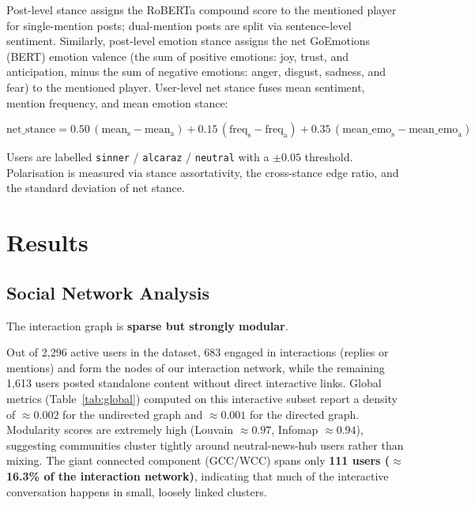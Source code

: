 \documentclass[12pt,a4paper]{article}
\begin{document}
Post-level stance assigns the RoBERTa compound score to the mentioned player for single-mention
posts; dual-mention posts are split via sentence-level sentiment. Similarly, post-level emotion stance assigns the net GoEmotions (BERT) emotion valence (the sum of positive emotions: joy, trust, and anticipation, minus the sum of negative emotions: anger, disgust, sadness, and fear) to the mentioned player.
User-level net stance fuses mean sentiment, mention frequency, and mean emotion stance:

\[
\text{net\_stance} = 0.50\,(\text{mean}_\text{s} - \text{mean}_\text{a})
                   + 0.15\,(\text{freq}_\text{s} - \text{freq}_\text{a})
                   + 0.35\,(\text{mean\_emo}_\text{s} - \text{mean\_emo}_\text{a})
\]

Users are labelled \texttt{sinner} / \texttt{alcaraz} / \texttt{neutral} with a $\pm 0.05$ threshold.
Polarisation is measured via stance assortativity, the cross-stance edge ratio, and the standard
deviation of net stance.

\bigskip

\section{Results}

\subsection{Social Network Analysis}
\label{sec:netresults}

The interaction graph is \textbf{sparse but strongly modular}. 

Out of 2{,}296 active users in the dataset, 683 engaged in interactions (replies or mentions) 
and form the nodes of our interaction network, while the remaining 1{,}613 users posted standalone 
content without direct interactive links. Global metrics (Table~\ref{tab:global}) 
computed on this interactive subset report a density of $\approx 0.002$ for the undirected graph 
and $\approx 0.001$ for the directed graph. Modularity scores are extremely high (Louvain $\approx 0.97$, 
Infomap $\approx 0.94$), suggesting communities cluster tightly around neutral-news-hub users rather than mixing. 
The giant connected component (GCC/WCC) spans only \textbf{111 users ($\approx$16.3\% of the interaction network)}, 
indicating that much of the interactive conversation happens in small, loosely linked clusters. 
\end{document}
